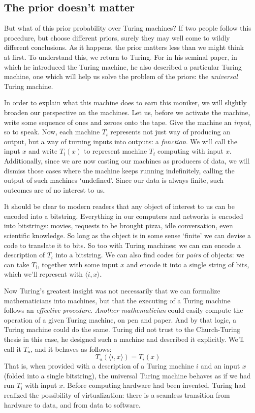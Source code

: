 
\subsection{The prior doesn't matter}

But what of this prior probability over Turing machines? If two people follow this procedure, but choose different priors, surely they may well come to wildly different conclusions. As it happens, the prior matters less than we might think at first. To understand this, we return to Turing. For in his seminal paper, in which he introduced the Turing machine, he also described a particular Turing machine, one which will help us solve the problem of the priors: the \emph{universal} Turing machine.


In order to explain what this machine does to earn this moniker, we will slightly broaden our perspective on the machines. Let us, before we activate the machine, write some sequence of ones and zeroes onto the tape. Give the machine an \emph{input}, so to speak. Now, each machine $T_i$ represents not just way of producing an output, but a way of turning inputs into outputs: a \emph{function}. We will call the input $x$ and write $T_i(x)$ to represent machine $T_i$ computing with input $x$. Additionally, since we are now casting our machines as producers of data, we will dismiss those cases where the machine keeps running indefinitely, calling the output of such machines `undefined'. Since our data is always finite, such outcomes are of no interest to us.

It should be clear to modern readers that any object of interest to us can be encoded into a bitstring. Everything in our computers and networks is encoded into bitstrings: movies, requests to be brought pizza, idle conversation, even scientific knowledge. So long as the object is in some sense `finite' we can devise a code to translate it to bits. So too with Turing machines; we can can encode a description of $T_i$ into a bitstring. We can also find codes for \emph{pairs} of objects: we can take $T_i$, together with some input $x$ and encode it into a single string of bits, which we'll represent with $\langle i, x\rangle$.

Now Turing's greatest insight was not necessarily that we can formalize mathematicians into machines, but that the executing of a Turing machine follows an \emph{effective procedure}. \emph{Another mathematician} could easily compute the operation of a given Turing machine, on pen and paper. And by that logic, a Turing machine could do the same. Turing did not trust to the Church-Turing thesis in this case, he designed such a machine and described it explicitly. We'll call it $T_u$, and it behaves as follows:
\[
T_u(\langle i, x\rangle) = T_i(x)
\]  
That is, when provided with a description of a Turing machine $i$ and an input $x$ (folded into a single bitstring), the universal Turing machine behaves as if we had run $T_i$ with input $x$. Before computing hardware had been invented, Turing had realized the possibility of virtualization: there is a seamless transition from hardware to data, and from data to software. 

